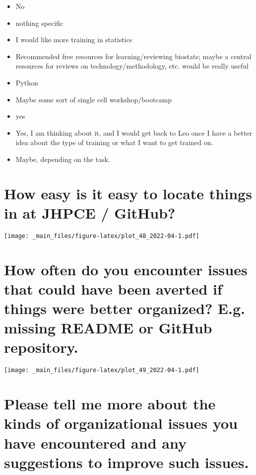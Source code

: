 \documentclass[
]{book}
\providecommand{\tightlist}{%
  \setlength{\itemsep}{0pt}\setlength{\parskip}{0pt}}
\begin{document}
\begin{itemize}
\tightlist
\item
  No
\item
  nothing specific
\item
  I would like more training in statistics
\item
  Recommended free resources for learning/reviewing biostats; maybe a central resources for reviews on technology/methodology, etc. would be really useful
\item
  Python
\item
  Maybe some sort of single cell workshop/bootcamp
\item
  yes
\item
  Yes, I am thinking about it, and I would get back to Leo once I have a better idea about the type of training or what I want to get trained on.
\item
  Maybe, depending on the task.
\end{itemize}

\hypertarget{how-easy-is-it-easy-to-locate-things-in-at-jhpce-github}{%
\section{How easy is it easy to locate things in at JHPCE / GitHub?}\label{how-easy-is-it-easy-to-locate-things-in-at-jhpce-github}}

\texttt{[image: \_main\_files/figure-latex/plot\_48\_2022-04-1.pdf]}

\hypertarget{how-often-do-you-encounter-issues-that-could-have-been-averted-if-things-were-better-organized-e.g.-missing-readme-or-github-repository.}{%
\section{How often do you encounter issues that could have been averted if things were better organized? E.g. missing README or GitHub repository.}\label{how-often-do-you-encounter-issues-that-could-have-been-averted-if-things-were-better-organized-e.g.-missing-readme-or-github-repository.}}

\texttt{[image: \_main\_files/figure-latex/plot\_49\_2022-04-1.pdf]}

\hypertarget{please-tell-me-more-about-the-kinds-of-organizational-issues-you-have-encountered-and-any-suggestions-to-improve-such-issues.}{%
\section{Please tell me more about the kinds of organizational issues you have encountered and any suggestions to improve such issues.}\label{please-tell-me-more-about-the-kinds-of-organizational-issues-you-have-encountered-and-any-suggestions-to-improve-such-issues.}}
\end{document}
